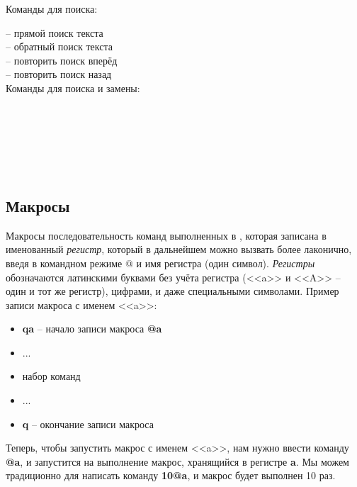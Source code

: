 Команды для поиска:

\noindent
\keys{/} -- прямой поиск текста\\
 -- обратный поиск текста\\
 -- повторить поиск вперёд\\
 -- повторить поиск назад\\

Команды для поиска и замены:

\noindent
{}\\
\\
\\
\\
\\

\subsection*{Макросы}

Макросы последовательность команд выполненных в , которая записана в именованный \textit{регистр}, который в дальнейшем можно вызвать более лаконично, введя в командном режиме @ и имя регистра (один символ). \textit{Регистры} обозначаются латинскими буквами без учёта регистра (<<a>> и <<A>> -- один и тот же регистр), цифрами, и даже специальными символами. Пример записи макроса с именем <<a>>:
\begin{itemize}
\item \textbf{qa} -- начало записи макроса \textbf{@a}
\item ...
\item набор команд 
\item ...
\item \textbf{q} -- окончание записи макроса
\end{itemize}

Теперь, чтобы запустить макрос с именем <<a>>, нам нужно ввести команду \textbf{@a}, и запустится на выполнение макрос, хранящийся в регистре \textbf{a}. Мы можем традиционно для  написать команду \textbf{10@a}, и макрос будет выполнен 10 раз.

